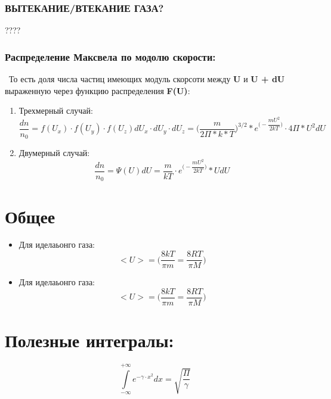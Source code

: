 \documentclass[12pt]{article}
\begin{document}
\subsubsection{ВЫТЕКАНИЕ/ВТЕКАНИЕ ГАЗА?}
????
\subsubsection{Распределение Максвела по модолю скорости:}\
\indent То есть доля числа частиц имеющих модуль скорсоти между \textbf{U} и \textbf{U + dU} выраженную через функцию распределения \textbf{F(U)}:

\begin{enumerate}
\item Трехмерный случай:
\[\dfrac{dn}{n_0} = f(U_x) \cdot f(U_y) \cdot f(U_z) dU_x\cdot dU_y \cdot dU_z = \Big(\dfrac{m}{2\Pi*k*T}\Big)^{3/2}*e^{\Big(-\dfrac{mU^2}{2kT}\Big)}\cdot 4\Pi*U^2dU \] 

\item Двумерный случай:
\[\dfrac{dn}{n_0} = \Psi(U)dU = \dfrac{m}{kT}\cdot e^{\Big(-\dfrac{mU^2}{2kT}\Big)}*U dU\]

\end{enumerate}
\section{Общее}
\begin{multicols}{2}[
\textcolor{blue}{} 
]
\begin{itemize}
\item Для иделаьонго газа:
\[<U> = \Big(\dfrac{8kT}{\pi m} = \dfrac{8RT}{\pi M}  \Big) \]
\end{itemize}

\begin{itemize}
\item Для иделаьонго газа:
\[<U> = \Big(\dfrac{8kT}{\pi m} = \dfrac{8RT}{\pi M}  \Big) \]
\end{itemize}

\end{multicols}


\section{Полезные интегралы:}

\begin{equation}
\int\limits_{-\infty}^{+\infty} e^{-\gamma \cdot x^2} dx = \sqrt{\frac{\Pi}{\gamma}}
\end{equation}
\end{document}
